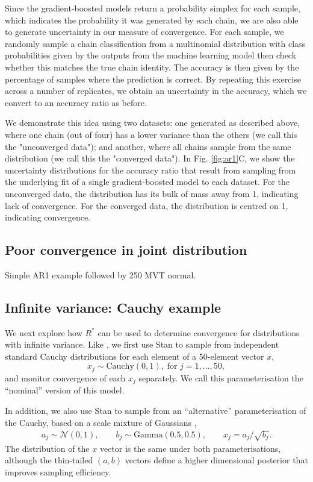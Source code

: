 \documentclass{article}
\newcommand{\N}{\mathcal{N}}
\begin{document}
Since the gradient-boosted models return a probability simplex for each sample, which indicates the probability it was generated by each chain, we are also able to generate uncertainty in our measure of convergence. For each sample, we randomly sample a chain classification from a multinomial distribution with class probabilities given by the outputs from the machine learning model then check whether this matches the true chain identity. The accuracy is then given by the percentage of samples where the prediction is correct. By repeating this exercise across a number of replicates, we obtain an uncertainty in the accuracy, which we convert to an accuracy ratio as before.

We demonstrate this idea using two datasets: one generated as described above, where one chain (out of four) has a lower variance than the others (we call this the "unconverged data"); and another, where all chains sample from the same distribution (we call this the "converged data"). In Fig. \ref{fig:ar1}C, we show the uncertainty distributions for the accuracy ratio that result from sampling from the underlying fit of a single gradient-boosted model to each dataset. For the unconverged data, the distribution has its bulk of mass away from 1, indicating lack of convergence. For the converged data, the distribution is centred on 1, indicating convergence. 

\subsection{Poor convergence in joint distribution}
Simple AR1 example followed by 250 MVT normal.

\subsection{Infinite variance: Cauchy example}
We next explore how $R^*$ can be used to determine convergence for distributions with infinite variance. Like \cite{vehtari2019rank}, we first use Stan to sample from independent standard Cauchy distributions for each element of a 50-element vector $x$,
%
\begin{equation}
x_j\sim \text{Cauchy}(0, 1),\; \text{for } j=1,...,50,
\end{equation}
%
and monitor convergence of each $x_j$ separately. We call this parameterisation the ``nominal'' version of this model.

In addition, we also use Stan to sample from an ``alternative'' parameterisation of the Cauchy, based on a scale mixture of Gaussians \cite{vehtari2019rank},
%
\begin{align}
a_j \sim  \N(0,1), \qquad
b_j \sim  \text{Gamma}(0.5, 0.5), \qquad
x_j =  a_j/\sqrt{b_j}.
\end{align}
%
The distribution of the $x$ vector is the same under both parameterisations, although the thin-tailed $(a,b)$ vectors define a higher dimensional posterior that improves sampling efficiency.
\end{document}
